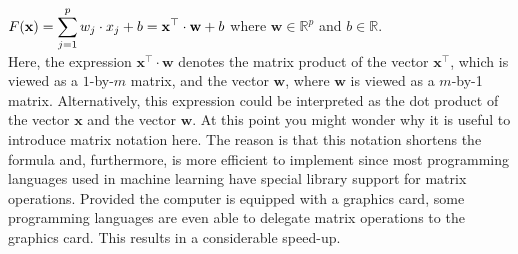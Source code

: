 \\[0.2cm]
\hspace*{1.3cm}
$\displaystyle F(\mathbf{x}) = \sum\limits_{j=1}^p w_j \cdot x_j + b = \mathbf{x}^\top \cdot \mathbf{w} + b$ 
\quad where  $\mathbf{w} \in \mathbb{R}^p$ and $b\in\mathbb{R}$.
\\[0.2cm]
Here, the expression $\mathbf{x}^\top \cdot \mathbf{w}$ denotes the matrix product of the vector
$\mathbf{x}^\top$, which is viewed as a $1$-by-$m$ matrix, and the vector $\mathbf{w}$, where $\mathbf{w}$ is
viewed as a $m$-by-1 matrix.  Alternatively, this
expression could be interpreted as the dot product of the vector $\mathbf{x}$ and the vector $\mathbf{w}$.
At this point you might wonder why it is useful to introduce matrix notation here.  The reason is
that this notation shortens the formula and, furthermore, is more efficient to implement since most
programming languages used in machine learning have special library support for matrix operations.  
Provided the computer is equipped with a graphics card,  some
programming languages are even able to delegate matrix operations to the graphics card.  This results in a
considerable speed-up.

